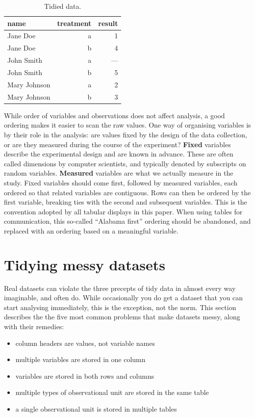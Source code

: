 \documentclass[article]{jss}
\begin{document}
\begin{table}[htbp]
  \centering
  \begin{tabular}{lrr}
    \toprule
    name &    treatment    & result  \\
    \midrule
    Jane Doe      & a & 1 \\
    Jane Doe      & b & 4 \\
    John Smith    & a & --- \\
    John Smith    & b & 5 \\
    Mary Johnson  & a & 2 \\
    Mary Johnson  & b & 3 \\
    \bottomrule
  \end{tabular}
  \caption{Tidied data.}
  \label{tbl:preg-tidy}
\end{table}

While order of variables and observations does not affect analysis, a good ordering makes it easier to scan the raw values. One way of organising variables is by their role in the analysis: are values fixed by the design of the data collection, or are they measured during the course of the experiment? \textbf{Fixed} variables describe the experimental design and are known in advance. These are often called dimensions by computer scientists, and typically denoted by subscripts on random variables. \textbf{Measured} variables are what we actually measure in the study. Fixed variables should come first, followed by measured variables, each ordered so that related variables are contiguous. Rows can then be ordered by the first variable, breaking ties with the second and subsequent variables. This is the convention adopted by all tabular displays in this paper. When using tables for communication, this so-called ``Alabama first'' \citep{wainer:2000} ordering should be abandoned, and replaced with an ordering based on a meaningful variable.

\section{Tidying messy datasets}
\label{sec:tidying}

Real datasets can violate the three precepts of tidy data in almost every way imaginable, and often do. While occasionally you do get a dataset that you can start analysing immediately, this is the exception, not the norm.  This section describes the the five most common problems that make datasets messy, along with their remedies:

\begin{itemize}
  \item column headers are values, not variable names
  \item multiple variables are stored in one column
  \item variables are stored in both rows and columns
  \item multiple types of observational unit are stored in the same table
  \item a single observational unit is stored in multiple tables
\end{itemize}
\end{document}
